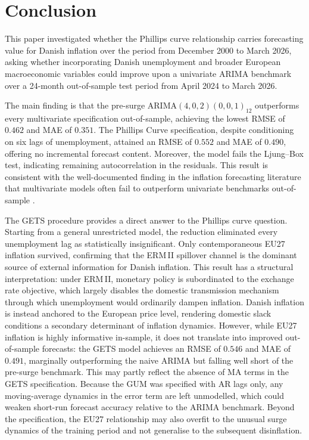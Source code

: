 \chapter{Conclusion}\label{sec:conclusion}
This paper investigated whether the Phillips curve relationship carries  forecasting value for Danish inflation over the period from December 2000 to March 2026, asking whether incorporating Danish unemployment and broader European macroeconomic variables could improve upon a univariate ARIMA  benchmark over a 24-month out-of-sample test period from April 2024 to March 2026.

The main finding is that the pre-surge ARIMA$(4,0,2)(0,0,1)_{12}$ outperforms every multivariate specification out-of-sample, achieving the lowest RMSE of $0.462$ and MAE of $0.351$. The Phillips Curve specification, despite conditioning on six lags of unemployment, attained an RMSE of $0.552$ and MAE of $0.490$, offering no incremental forecast content. Moreover, the model fails the Ljung--Box test, indicating remaining autocorrelation in the residuals. This result is consistent with the well-documented finding in the inflation forecasting literature that multivariate models often fail to outperform univariate benchmarks out-of-sample \parencite{stock_watson_2008}.

The GETS procedure provides a direct answer to the Phillips curve question. Starting from a general unrestricted model, the reduction eliminated every unemployment lag as statistically insignificant. Only contemporaneous EU27 inflation survived, confirming that the ERM\,II spillover channel is the dominant source of external information for Danish inflation. This result has a structural interpretation: under ERM\,II, monetary policy is subordinated to the exchange rate objective, which largely disables the domestic transmission mechanism through which unemployment would ordinarily dampen inflation. Danish inflation is instead anchored to the European price level, rendering domestic slack conditions a secondary determinant of inflation dynamics. However, while EU27 inflation is highly informative in-sample, it does not translate into improved out-of-sample forecasts: the GETS model achieves an RMSE of $0.546$ and MAE of $0.491$, marginally outperforming the naive ARIMA but falling well short of the pre-surge benchmark. This may partly reflect the absence of MA terms in the GETS specification. Because the GUM was specified with AR lags only, any moving-average dynamics in the error term are left unmodelled, which could weaken short-run forecast accuracy relative to the ARIMA benchmark. Beyond the specification, the EU27 relationship may also overfit to the unusual surge dynamics of the training period and not generalise to the subsequent disinflation.

